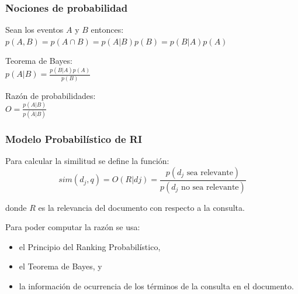 \documentclass[
10pt, %
aspectratio=169, %
]{beamer}
\begin{document}
	\begin{frame}
		
		\frametitle{Nociones de probabilidad}
		
		Sean los eventos $A$ y $B$ entonces: \\
		\hspace{5.3cm} $p(A, B) = p(A \cap B) = p(A|B)p(B) = p(B|A)p(A)$
		
		\vspace{2\baselineskip}
		
		Teorema de Bayes: \\
		\hspace{3cm} $p(A|B) = \frac{p(B|A)p(A)}{p(B)}$
		
		
		\vspace{3\baselineskip}
		
		Razón de probabilidades: \\
		\hspace{4cm} $O = \frac{p(A|B)}{p(\overline{A}|B)}$
		
		
	\end{frame}
	
	\begin{frame}
		
		\frametitle{Modelo Probabilístico de RI}
		
		Para calcular la similitud se define la función:
		$$sim(d_j, q) = O(R|dj) = \frac{p(d_j \text{\ sea relevante})}{p(d_j \text{\ no sea relevante})}$$
		
		donde $R$ es la relevancia del documento con respecto a la consulta.
		
		\pause
		\vspace{2\baselineskip}
		
		Para poder computar la razón se usa:
		\begin{itemize}
			\item el Principio del Ranking Probabilístico, 
			\item el Teorema de Bayes, y
			\item la información de ocurrencia de los términos de la consulta en el documento.
		\end{itemize}
		
	\end{frame}
	
\end{document}
